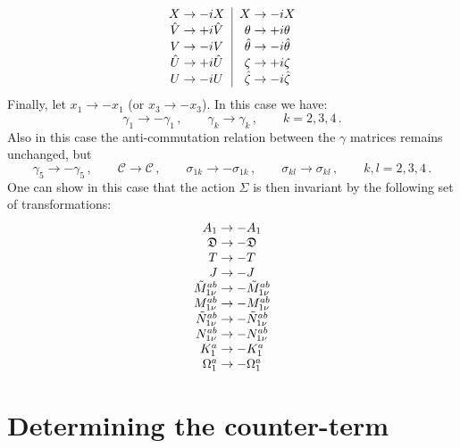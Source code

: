 \begin{appendix}
\begin{equation}
\begin{tabular}{c|c}
$X\to-iX$&$X\to-iX$\\
$\hat{V}\to+i\hat{V}$&$\theta\to+i\theta$\\
$V\to-iV$&$\hat\theta\to-i\hat\theta$\\
$\hat{U}\to+i\hat{U}$&$\zeta\to+i\zeta$\\
$U\to-iU$&$\hat\zeta\to-i\hat\zeta$
\end{tabular}
\end{equation}
Finally, let $x_1\to-x_1$ (or $x_3\to-x_3$). In this case we have:
\begin{equation}
\gamma_{1}\to-\gamma_{1}\,,\qquad\gamma_{k}\to\gamma_{k}\,,\qquad k=2,3,4\,.
\end{equation}
Also in this case the anti-commutation relation between the $\gamma$ matrices remains unchanged, but
\begin{equation}
\gamma_{5}\to-\gamma_{5}\,,\qquad
\mathcal{C}\to\mathcal{C}\,,\qquad
\sigma_{1k}\to-\sigma_{1k}\,,\qquad
\sigma_{kl}\to\sigma_{kl}\,,\qquad
k,l=2,3,4\,.
\end{equation}
One can show in this case that the action $\Sigma$ is then invariant by the following set of transformations:
\begin{equation}
\begin{tabular}{c}
$A_1\to-A_{1}$\\
$\mathfrak{D}\to-\mathfrak{D}$\\
$T\to-T$\\
$J\to-J$\\
$\tilde{M}^{ab}_{1\nu}\to-\tilde{M}^{ab}_{1\nu}$\\
$M^{ab}_{1\nu}\to-M^{ab}_{1\nu}$\\
$\tilde{N}^{ab}_{1\nu}\to-\tilde{N}^{ab}_{1\nu}$\\
$N^{ab}_{1\nu}\to-N^{ab}_{1\nu}$\\
$K^{a}_{1} \to - K^{a}_{1}$\\
$\Omega^{a}_{1} \to - \Omega^{a}_{1}$
\end{tabular}
\end{equation}









\section{Determining the counter-term}


\end{appendix}
